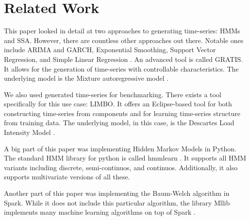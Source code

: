 \chapter{Related Work}\label{chapter:related}

This paper looked in detail at two approaches to generating time-series: HMMs and SSA. However, there are countless other approaches out there. Notable ones include ARIMA and GARCH, Exponential Smoothing, Support Vector Regression, and Simple Linear Regression \parencite{inproceedings}. An advanced tool is called GRATIS. It allows for the generation of time-series with controllable characteristics. The underlying model is the Mixture autoregressive model \parencite{kang2019gratis}.

We also used generated time-series for benchmarking. There exists a tool specifically for this use case: LIMBO. It offers an Eclipse-based tool for both constructing time-series from components and for learning time-series structure from training data. The underlying model, in this case, is the Descartes Load Intensity Model \parencite{v2014limbo}.

A big part of this paper was implementing Hidden Markov Models in Python. The standard HMM library for python is called hmmlearn \parencite{weiss2019hmmlearn}. It supports all HMM variants including discrete, semi-continuos, and continuos. Additionally, it also supports multivariate versions of all these. 

Another part of this paper was implementing the Baum-Welch algorithm in Spark. While it does not include this particular algorithm, the library Mllib implements many machine learning algorithms on top of Spark \parencite{meng2016mllib}.